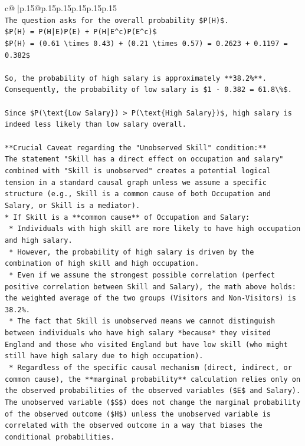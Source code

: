 \documentclass{article}
\begin{document}
{\begin{supertabular}{c@{$\;$}|p{.15\linewidth}@{}p{.15\linewidth}p{.15\linewidth}p{.15\linewidth}p{.15\linewidth}p{.15\linewidth}}
{{{\\ 
\texttt{The question asks for the overall probability \$P(H)\$.} \\
\texttt{\$P(H) = P(H|E)P(E) + P(H|E\^{}c)P(E\^{}c)\$} \\
\texttt{\$P(H) = (0.61 \textbackslash{}times 0.43) + (0.21 \textbackslash{}times 0.57) = 0.2623 + 0.1197 = 0.382\$} \\
\\ 
\texttt{So, the probability of high salary is approximately **38.2\%**. Consequently, the probability of low salary is \$1 {-} 0.382 = 61.8\textbackslash{}\%\$.} \\
\\ 
\texttt{Since \$P(\textbackslash{}text\{Low Salary\}) > P(\textbackslash{}text\{High Salary\})\$, high salary is indeed less likely than low salary overall.} \\
\\ 
\texttt{**Crucial Caveat regarding the "Unobserved Skill" condition:**} \\
\texttt{The statement "Skill has a direct effect on occupation and salary" combined with "Skill is unobserved" creates a potential logical tension in a standard causal graph unless we assume a specific structure (e.g., Skill is a common cause of both Occupation and Salary, or Skill is a mediator).} \\
\texttt{*   If Skill is a **common cause** of Occupation and Salary:} \\
\texttt{    *   Individuals with high skill are more likely to have high occupation and high salary.} \\
\texttt{    *   However, the probability of high salary is driven by the combination of high skill and high occupation.} \\
\texttt{    *   Even if we assume the strongest possible correlation (perfect positive correlation between Skill and Salary), the math above holds: the weighted average of the two groups (Visitors and Non{-}Visitors) is 38.2\%.} \\
\texttt{    *   The fact that Skill is unobserved means we cannot distinguish between individuals who have high salary *because* they visited England and those who visited England but have low skill (who might still have high salary due to high occupation).} \\
\texttt{    *   Regardless of the specific causal mechanism (direct, indirect, or common cause), the **marginal probability** calculation relies only on the observed probabilities of the observed variables (\$E\$ and Salary). The unobserved variable (\$S\$) does not change the marginal probability of the observed outcome (\$H\$) unless the unobserved variable is correlated with the observed outcome in a way that biases the conditional probabilities.} \\
}}}
\end{supertabular}}
\end{document}
